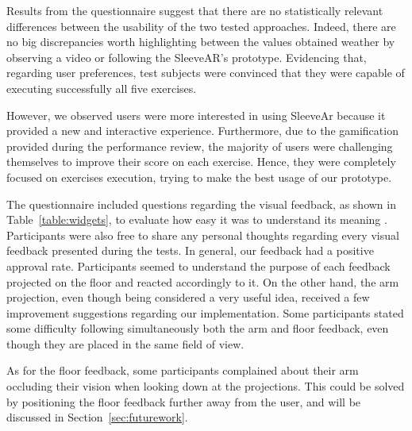 Results from the questionnaire suggest that there are no statistically relevant differences between the usability of the two tested approaches. Indeed, there are  no big discrepancies worth highlighting between the values obtained weather by observing a video or following the SleeveAR's prototype.
Evidencing that, regarding user preferences, test subjects were convinced that they were capable of executing successfully all five exercises. 

However, we observed users were more interested in using SleeveAr because it provided a new and interactive experience. 
Furthermore, due to the gamification provided during the performance review, the majority of users were challenging themselves to improve their score on each exercise. Hence, they were completely focused on exercises execution, trying to make the best usage of our prototype.

The questionnaire included questions regarding the visual feedback, as shown in Table~\ref{table:widgets}, to evaluate how easy it was to understand its meaning . Participants were also free to share any personal thoughts regarding every visual feedback presented during the tests.
In general, our feedback had a positive approval rate. Participants seemed to understand the purpose of each feedback projected on the floor and reacted accordingly to it. 
On the other hand, the arm projection, even though being considered a very useful idea, received a few improvement suggestions regarding our implementation. Some participants stated some difficulty following simultaneously both the arm and floor feedback, even though they are placed in the same field of view.

As for the floor feedback, some participants complained about their arm occluding their vision when looking down at the projections. 
This could be solved by positioning the floor feedback further away from the user, and will be discussed in Section~\ref{sec:futurework}.

\begin{table}[!t]
\centering
{}
\caption{Widgets Questionnaire}
\label{table:widgets}
\end{table}

